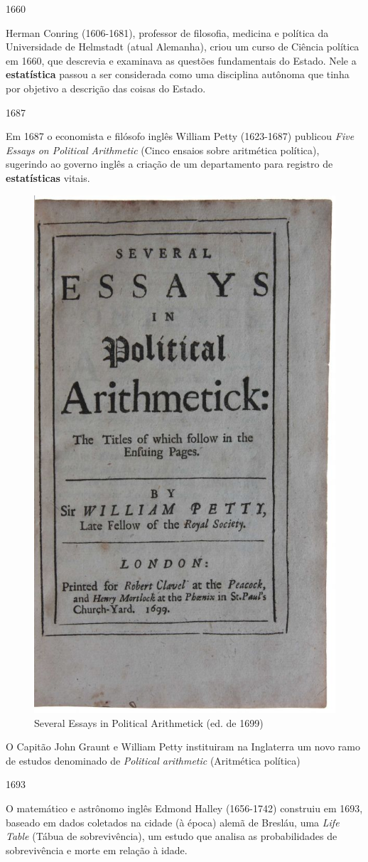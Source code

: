 \documentclass[
]{book}
\theoremstyle{definition}
\theoremstyle{definition}
\theoremstyle{definition}
\theoremstyle{definition}
\theoremstyle{remark}
\begin{document}
1660

Herman Conring (1606-1681), professor de filosofia, medicina e política da Universidade de Helmstadt (atual Alemanha), criou um curso de Ciência política em 1660, que descrevia e examinava as questões fundamentais do Estado. Nele a \textbf{estatística} passou a ser considerada como uma disciplina autônoma que tinha por objetivo a descrição das coisas do Estado.

1687

Em 1687 o economista e filósofo inglês William Petty (1623-1687) publicou \emph{Five Essays on Political Arithmetic} (Cinco ensaios sobre aritmética política), sugerindo ao governo inglês a criação de um departamento para registro de \textbf{estatísticas} vitais.

\begin{figure}

{\centering \includegraphics[width=0.5\linewidth]{images/petty} 

}

\caption{Several Essays in Political Arithmetick (ed. de 1699)}\label{fig:unnamed-chunk-4}
\end{figure}

O Capitão John Graunt e William Petty instituiram na Inglaterra um novo ramo de estudos denominado de \textit{Political arithmetic} (Aritmética política)

1693

O matemático e astrônomo inglês Edmond Halley (1656-1742) construiu em 1693, baseado em dados coletados na cidade (à época) alemã de Bresláu, uma \emph{Life Table} (Tábua de sobrevivência), um estudo que analisa as probabilidades de sobrevivência e morte em relação à idade.
\end{document}
